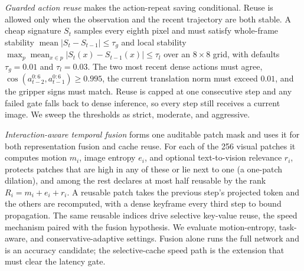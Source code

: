 \emph{Guarded action reuse} makes the action-repeat saving conditional. Reuse is
allowed only when the observation and the recent trajectory are both stable. A
cheap signature $S_t$ samples every eighth pixel and must satisfy whole-frame
stability $\operatorname{mean}|S_t-S_{t-1}| \le \tau_g$ and local stability
$\max_{p} \operatorname{mean}_{x\in p}|S_t(x)-S_{t-1}(x)| \le \tau_l$ over an
$8\times 8$ grid, with defaults $\tau_g=0.01$ and $\tau_l=0.03$. The two most
recent dense actions must agree, $\cos(a_{t-2}^{0:6},a_{t-1}^{0:6}) \ge 0.995$,
the current translation norm must exceed $0.01$, and the gripper signs must
match. Reuse is capped at one consecutive step and any failed gate falls back to
dense inference, so every step still receives a current image. We sweep the
thresholds as strict, moderate, and aggressive.

\emph{Interaction-aware temporal fusion} forms one auditable patch mask and uses
it for both representation fusion and cache reuse. For each of the 256 visual
patches it computes motion $m_i$, image entropy $e_i$, and optional
text-to-vision relevance $r_i$, protects patches that are high in any of these
or lie next to one (a one-patch dilation), and among the rest declares at most
half reusable by the rank $R_i = m_i+e_i+r_i$. A reusable patch takes the
previous step's projected token and the others are recomputed, with a dense
keyframe every third step to bound propagation. The same reusable indices drive
selective key-value reuse, the speed mechanism paired with the fusion
hypothesis. We evaluate motion-entropy, task-aware, and conservative-adaptive
settings. Fusion alone runs the full network and is an accuracy candidate; the
selective-cache speed path is the extension that must clear the latency gate.

